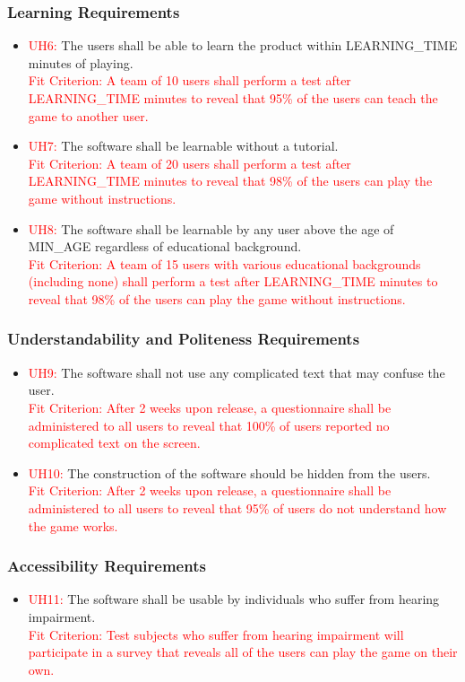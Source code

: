 \documentclass[12pt, titlepage]{article}
\begin{document}
\subsubsection{Learning Requirements}
\begin{itemize}
\item \textcolor{red}{UH6: }The users shall be able to learn the product within LEARNING\_TIME minutes of playing.\\
\textcolor{red}{Fit Criterion: A team of 10 users shall perform a test after LEARNING\_TIME minutes to reveal that 95\% of the users can teach the game to another user.}
\item \textcolor{red}{UH7: }The software shall be learnable without a tutorial.\\
\textcolor{red}{Fit Criterion: A team of 20 users shall perform a test after LEARNING\_TIME minutes to reveal that 98\% of the users can play the game without instructions.}
\item \textcolor{red}{UH8: }The software shall be learnable by any user above the age of MIN\_AGE regardless of educational background.\\
\textcolor{red}{Fit Criterion: A team of 15 users with various educational backgrounds (including none) shall perform a test after LEARNING\_TIME minutes to reveal that 98\% of the users can play the game without instructions.}
\end{itemize}

\subsubsection{Understandability and Politeness Requirements}
\begin{itemize}
\item \textcolor{red}{UH9: }The software shall not use any complicated text that may confuse the user.\\
\textcolor{red}{Fit Criterion: After 2 weeks upon release, a questionnaire shall be administered to all users to reveal that 100\% of users reported no complicated text on the screen.}
\item \textcolor{red}{UH10: }The construction of the software should be hidden from the users.\\
\textcolor{red}{Fit Criterion: After 2 weeks upon release, a questionnaire shall be administered to all users to reveal that 95\% of users do not understand how the game works.}
\end{itemize}

\subsubsection{Accessibility Requirements}
\begin{itemize}
\item \textcolor{red}{UH11: }The software shall be usable by individuals who suffer from hearing impairment.\\
\textcolor{red}{Fit Criterion: Test subjects who suffer from hearing impairment will participate in a survey that reveals all of the users can play the game on their own.}
\end{itemize}
\end{document}
